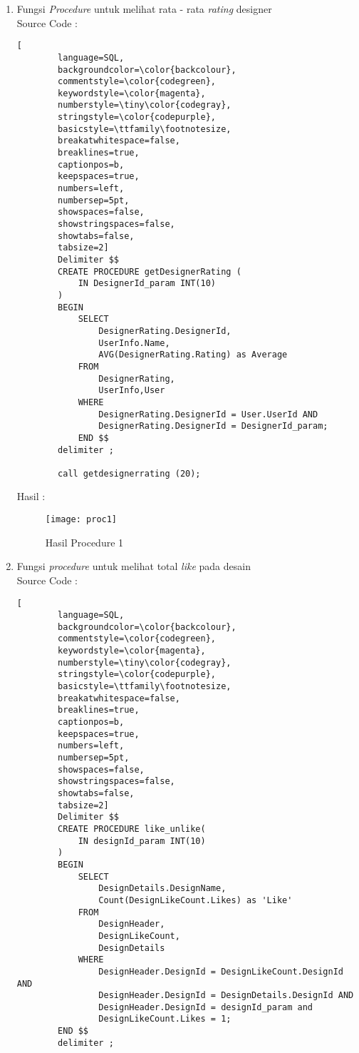 \begin{enumerate}
	\item 	Fungsi \textit{Procedure} untuk melihat rata - rata \textit{rating} designer \\
	Source Code :
	\begin{lstlisting}[
		language=SQL,
		backgroundcolor=\color{backcolour},   
		commentstyle=\color{codegreen},
		keywordstyle=\color{magenta},
		numberstyle=\tiny\color{codegray},
		stringstyle=\color{codepurple},
		basicstyle=\ttfamily\footnotesize,
		breakatwhitespace=false,         
		breaklines=true,                 
		captionpos=b,                    
		keepspaces=true,                 
		numbers=left,                    
		numbersep=5pt,                  
		showspaces=false,                
		showstringspaces=false,
		showtabs=false,                  
		tabsize=2]
		Delimiter $$
		CREATE PROCEDURE getDesignerRating (
			IN DesignerId_param INT(10)
		)
		BEGIN
			SELECT 
				DesignerRating.DesignerId, 
				UserInfo.Name,
				AVG(DesignerRating.Rating) as Average
			FROM 
				DesignerRating, 
				UserInfo,User
			WHERE
				DesignerRating.DesignerId = User.UserId AND
				DesignerRating.DesignerId = DesignerId_param;
			END $$
		delimiter ;
		
		call getdesignerrating (20);
	\end{lstlisting} 
	Hasil : 
	\\
	\begin{figure}[H]
		\centering
		\texttt{[image: proc1]}
		\caption{Hasil Procedure 1}
	\end{figure}
	\item	Fungsi \textit{procedure} untuk melihat total \textit{like} pada desain \\
	Source Code :
	\begin{lstlisting}[
		language=SQL,
		backgroundcolor=\color{backcolour},   
		commentstyle=\color{codegreen},
		keywordstyle=\color{magenta},
		numberstyle=\tiny\color{codegray},
		stringstyle=\color{codepurple},
		basicstyle=\ttfamily\footnotesize,
		breakatwhitespace=false,         
		breaklines=true,                 
		captionpos=b,                    
		keepspaces=true,                 
		numbers=left,                    
		numbersep=5pt,                  
		showspaces=false,                
		showstringspaces=false,
		showtabs=false,                  
		tabsize=2]
		Delimiter $$
		CREATE PROCEDURE like_unlike(
			IN designId_param INT(10)
		)
		BEGIN
			SELECT
				DesignDetails.DesignName, 
				Count(DesignLikeCount.Likes) as 'Like'		
			FROM
				DesignHeader,
				DesignLikeCount,
				DesignDetails
			WHERE 
				DesignHeader.DesignId = DesignLikeCount.DesignId AND 
				DesignHeader.DesignId = DesignDetails.DesignId AND 
				DesignHeader.DesignId = designId_param and
				DesignLikeCount.Likes = 1;
		END $$
		delimiter ;
		

\end{lstlisting}
\end{enumerate}

